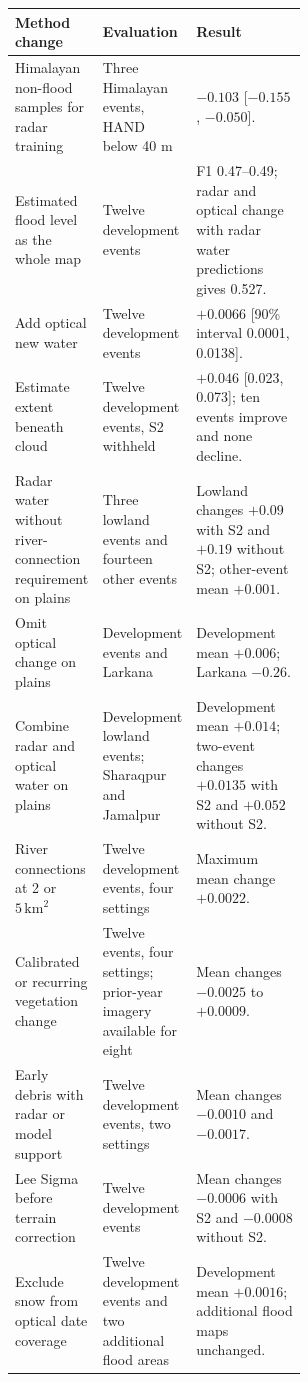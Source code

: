 \documentclass[10pt,twocolumn,letterpaper]{article}
\newcommand{\km}{\,\mathrm{km}}
\begin{document}
\par\noindent\begin{minipage}{\linewidth}
\label{tab:alternatives}
\fontsize{8.2}{9.6}\selectfont
\begin{tabularx}{\linewidth}{@{}P{0.30\linewidth}P{0.28\linewidth}L@{}}
\toprule
Method change & Evaluation & Result \\
\midrule
Himalayan non-flood samples for radar training & Three Himalayan events, HAND below 40 m &
$-0.103$ [$-0.155$, $-0.050$]. \\
Estimated flood level as the whole map & Twelve development events & F1 0.47--0.49; radar and
optical change with radar water predictions gives 0.527. \\
Add optical new water & Twelve development events & $+0.0066$ [90\% interval 0.0001, 0.0138]. \\
Estimate extent beneath cloud & Twelve development events, S2 withheld & $+0.046$ [0.023, 0.073];
ten events improve and none decline. \\
Radar water without river-connection requirement on plains & Three lowland events and fourteen
other events & Lowland changes $+0.09$ with S2 and $+0.19$ without S2; other-event mean $+0.001$. \\
Omit optical change on plains & Development events and Larkana & Development mean $+0.006$;
Larkana $-0.26$. \\
Combine radar and optical water on plains & Development lowland events; Sharaqpur and Jamalpur &
Development mean $+0.014$; two-event changes $+0.0135$ with S2 and $+0.052$ without S2. \\
River connections at 2 or $5\km^2$ & Twelve development events, four settings & Maximum mean change
$+0.0022$. \\
Calibrated or recurring vegetation change & Twelve events, four settings; prior-year imagery
available for eight & Mean changes $-0.0025$ to $+0.0009$. \\
Early debris with radar or model support & Twelve development events, two settings & Mean changes
$-0.0010$ and $-0.0017$. \\
Lee Sigma before terrain correction & Twelve development events & Mean changes $-0.0006$ with S2
and $-0.0008$ without S2. \\
Exclude snow from optical date coverage & Twelve development events and two additional flood areas &
Development mean $+0.0016$; additional flood maps unchanged. \\
\bottomrule
\end{tabularx}
\end{minipage}\par\vspace{8pt}
\end{document}
